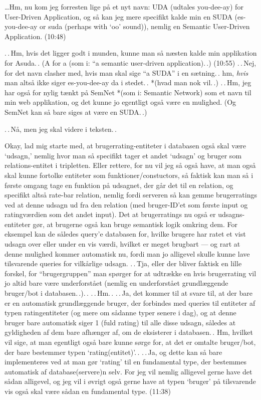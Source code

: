 \documentclass{report}
\begin{document}
\ldots Hm, nu kom jeg forresten lige på et nyt navn: UDA (udtales you-dee-ay) for User-Driven Application, og så kan jeg mere specifikt kalde min en SUDA (es-you-dee-ay or suda (perhaps with `oo' sound)), nemlig en Semantic User-Driven Application. (10:48) %

.\,.\,Hm, hvis det ligger godt i munden, kunne man så næsten kalde min applikation for Asuda.\,. (A for a (som i: ``a semantic user-driven application).\,.) (10:55) .\,.\,Nej, for det navn clasher med, hvis man skal sige ``a SUDA'' i en sætning.\,. hm, \emph{hvis} man altså ikke siger es-you-dee-ay da i stedet.\,. *(hvad man nok vil.\,.) .\,.\,Hm, jeg har også for nylig tænkt på SemNet *(som i: Semantic Network) som et navn til min web applikation, og det kunne jo egentligt også være en mulighed. (Og SemNet kan så bare siges at være en SUDA.\,.)

.\,.\,Nå, men jeg skal videre i teksten.\,. 

Okay, lad mig starte med, at brugerrating-entiteter i databasen også skal være `udsagn,' nemlig hvor man så specifikt tager et andet `udsagn' og bruger som relations-entitet i tripletten. Eller rettere, for nu vil jeg så også have, at man også skal kunne fortolke entiteter som funktioner/constuctors, så faktisk kan man så i første omgang tage en funktion på udsagnet, der går det til en relation, og specifikt altså rate-bar relation, nemlig fordi serveren så kan gemme brugerratings ved at denne udsagn ud fra den relation (med bruger-ID'et som første input og ratingværdien som det andet input). 
Det at brugerratings nu også er udsagns-entiteter gør, at brugerne også kan bruge semantisk logik omkring dem. For eksempel kan de således query'e databasen for, hvilke brugere har ratet et vist udsagn over eller under en vis værdi, hvilket er meget brugbart --- og rart at denne mulighed kommer automatisk nu, fordi man jo alligevel skulle kunne lave tilsvarende queries for vilkårlige udsagn. .\,.\,Tja, eller der bliver faktisk en lille forskel, for ``brugergruppen'' man spørger for at udtrække en hvis brugerrating vil jo altid bare være underforstået (nemlig en underforstået grundlæggende bruger/bot i databasen.\,.).\,. .\,.\,Hm.\,. 
.\,.\,Ja, det kommer til at svare til, at der bare er en automatisk grundlæggende bruger, der forbindes med queries til entiteter af typen ratingentiteter (og mere om sådanne typer senere i dag), og at denne bruger bare automatisk siger 1 (fuld rating) til alle disse udsagn, således at gyldigheden af dem bare afhænger af, om de eksisterer i databasen.\,. Hm, hvilket vil sige, at man egentligt også bare kunne sørge for, at det er omtalte bruger/bot, der bare bestemmer typen `rating(entitet)'.\,. .\,.\,Ja, og dette kan så bare implementeres ved at man gør `rating' til en fundamental type, der bestemmes automatisk af database(servere)n selv. For jeg vil nemlig alligevel gerne have det sådan alligevel, og jeg vil i øvrigt også gerne have at typen `bruger' på tilsvarende vis også skal være sådan en fundamental type. (11:38) 
\end{document}
